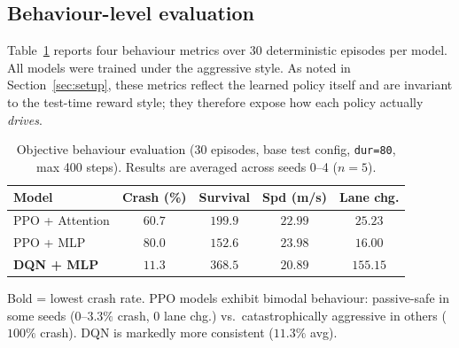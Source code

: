 \documentclass[conference]{IEEEtran}
\newcommand{\code}[1]{\texttt{#1}}
\begin{document}
\subsection{Behaviour-level evaluation}
\label{sec:behav}
Table~\ref{tab:eval} reports four behaviour metrics over 30 deterministic
episodes per model. All models were trained under the aggressive style. As noted
in Section~\ref{sec:setup}, these metrics reflect the learned policy itself and
are invariant to the test-time reward style; they therefore expose how each
policy actually \emph{drives}.

\begin{table}[t]
\caption{Objective behaviour evaluation (30 episodes, base test config, \code{dur=80}, max 400 steps). Results are averaged across seeds 0--4 ($n=5$).}
\label{tab:eval}
\centering
\small
\begin{tabular}{@{}lcccc@{}}
\toprule
Model & Crash (\%) & Survival & Spd (m/s) & Lane chg. \\
\midrule
PPO + Attention & $60.7$        & $199.9$ & $22.99$ & $25.23$ \\
PPO + MLP       & $80.0$        & $152.6$ & $23.98$ & $16.00$ \\
\textbf{DQN + MLP} & $\mathbf{11.3}$ & $368.5$ & $20.89$ & $155.15$ \\
\bottomrule
\end{tabular}
\vspace{2pt}
\parbox{\columnwidth}{\footnotesize Bold = lowest crash rate. PPO models exhibit bimodal behaviour:
passive-safe in some seeds ($0$--$3.3\%$ crash, $0$ lane chg.) vs.\ catastrophically aggressive in
others ($100\%$ crash). DQN is markedly more consistent ($11.3\%$ avg).}
\end{table}
\end{document}
